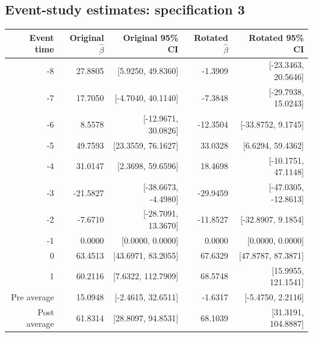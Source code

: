 \documentclass[10pt]{article}
\begin{document}
\subsection*{Event-study estimates: specification 3}
\begin{center}\scriptsize
\begin{tabular}{r rr rr}
\toprule
Event time & Original $\hat\beta$ & Original 95\% CI & Rotated $\hat\beta$ & Rotated 95\% CI \\
\midrule
-8 & 27.8805 & [5.9250, 49.8360] & -1.3909 & [-23.3463, 20.5646] \\
-7 & 17.7050 & [-4.7040, 40.1140] & -7.3848 & [-29.7938, 15.0243] \\
-6 & 8.5578 & [-12.9671, 30.0826] & -12.3504 & [-33.8752, 9.1745] \\
-5 & 49.7593 & [23.3559, 76.1627] & 33.0328 & [6.6294, 59.4362] \\
-4 & 31.0147 & [2.3698, 59.6596] & 18.4698 & [-10.1751, 47.1148] \\
-3 & -21.5827 & [-38.6673, -4.4980] & -29.9459 & [-47.0305, -12.8613] \\
-2 & -7.6710 & [-28.7091, 13.3670] & -11.8527 & [-32.8907, 9.1854] \\
-1 & 0.0000 & [0.0000, 0.0000] & 0.0000 & [0.0000, 0.0000] \\
0 & 63.4513 & [43.6971, 83.2055] & 67.6329 & [47.8787, 87.3871] \\
1 & 60.2116 & [7.6322, 112.7909] & 68.5748 & [15.9955, 121.1541] \\
\midrule
Pre average & 15.0948 & [-2.4615, 32.6511] & -1.6317 & [-5.4750, 2.2116] \\
Post average & 61.8314 & [28.8097, 94.8531] & 68.1039 & [31.3191, 104.8887] \\
\bottomrule
\end{tabular}
\end{center}
\clearpage
\end{document}

